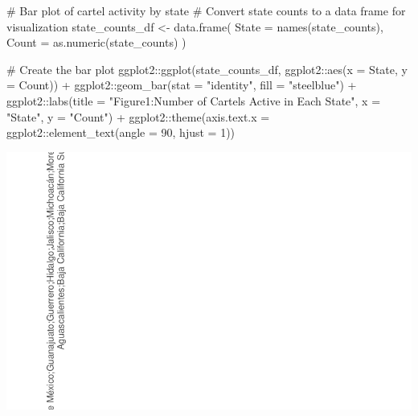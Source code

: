 \documentclass[
]{article}
\newenvironment{Shaded}{\begin{snugshade}}{\end{snugshade}}
\newcommand{\AttributeTok}[1]{\textcolor[rgb]{0.40,0.45,0.13}{#1}}
\newcommand{\CommentTok}[1]{\textcolor[rgb]{0.37,0.37,0.37}{#1}}
\newcommand{\DecValTok}[1]{\textcolor[rgb]{0.68,0.00,0.00}{#1}}
\newcommand{\FunctionTok}[1]{\textcolor[rgb]{0.28,0.35,0.67}{#1}}
\newcommand{\NormalTok}[1]{\textcolor[rgb]{0.00,0.23,0.31}{#1}}
\newcommand{\OtherTok}[1]{\textcolor[rgb]{0.00,0.23,0.31}{#1}}
\newcommand{\SpecialCharTok}[1]{\textcolor[rgb]{0.37,0.37,0.37}{#1}}
\newcommand{\StringTok}[1]{\textcolor[rgb]{0.13,0.47,0.30}{#1}}
\begin{document}
\begin{Shaded}
\begin{Highlighting}[]
\CommentTok{\# Bar plot of cartel activity by state}
\CommentTok{\# Convert state counts to a data frame for visualization}
\NormalTok{state\_counts\_df }\OtherTok{\textless{}{-}} \FunctionTok{data.frame}\NormalTok{(}
  \AttributeTok{State =} \FunctionTok{names}\NormalTok{(state\_counts),}
  \AttributeTok{Count =} \FunctionTok{as.numeric}\NormalTok{(state\_counts)}
\NormalTok{)}

\CommentTok{\# Create the bar plot}
\NormalTok{ggplot2}\SpecialCharTok{::}\FunctionTok{ggplot}\NormalTok{(state\_counts\_df, ggplot2}\SpecialCharTok{::}\FunctionTok{aes}\NormalTok{(}\AttributeTok{x =}\NormalTok{ State, }\AttributeTok{y =}\NormalTok{ Count)) }\SpecialCharTok{+}
\NormalTok{  ggplot2}\SpecialCharTok{::}\FunctionTok{geom\_bar}\NormalTok{(}\AttributeTok{stat =} \StringTok{"identity"}\NormalTok{, }\AttributeTok{fill =} \StringTok{"steelblue"}\NormalTok{) }\SpecialCharTok{+}
\NormalTok{  ggplot2}\SpecialCharTok{::}\FunctionTok{labs}\NormalTok{(}\AttributeTok{title =} \StringTok{"Figure1:Number of Cartels Active in Each State"}\NormalTok{, }\AttributeTok{x =} \StringTok{"State"}\NormalTok{, }\AttributeTok{y =} \StringTok{"Count"}\NormalTok{) }\SpecialCharTok{+}
\NormalTok{  ggplot2}\SpecialCharTok{::}\FunctionTok{theme}\NormalTok{(}\AttributeTok{axis.text.x =}\NormalTok{ ggplot2}\SpecialCharTok{::}\FunctionTok{element\_text}\NormalTok{(}\AttributeTok{angle =} \DecValTok{90}\NormalTok{, }\AttributeTok{hjust =} \DecValTok{1}\NormalTok{))}
\end{Highlighting}
\end{Shaded}

\includegraphics{Team4GroupProject_files/figure-pdf/unnamed-chunk-21-1.pdf}
\end{document}
